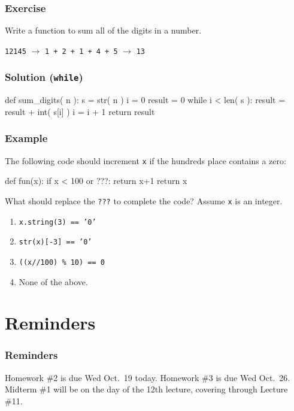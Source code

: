\documentclass[11pt]{beamer}
\begin{document}
\begin{frame}[fragile]
  \frametitle{Exercise}
  \Enlarge

  Write a function to sum all of the digits in a number.  %

  \begin{center}
  \texttt{12145} $\rightarrow$ \texttt{1 + 2 + 1 + 4 + 5} $\rightarrow$ \texttt{13}
  \end{center}
\end{frame}

\begin{frame}[fragile]
  \frametitle{Solution (\texttt{while})}
  \Enlarge

  \begin{semiverbatim}
def sum_digits( n ):
    s = str( n )
    i = 0
    result = 0
    while i < len( s ):
        result = result + int( s[i] )
        i = i + 1
    return result
  \end{semiverbatim}
\end{frame}


\begin{frame}[fragile]
	\frametitle{Example}
	\Enlarge
	
	The following code should increment \texttt{x} if the hundreds place contains a zero:
	\begin{semiverbatim}
        def fun(x): 
           if x < 100 or ???:
              return x+1
           return x 
\end{semiverbatim}
	What should replace the \texttt{???} to complete the code?  Assume \texttt{x} is an integer.
	\begin{enumerate}[label=\Alph*]
		\item  \texttt{x.string(3) == '0'}
		\item  \texttt{str(x)[-3] == '0'}  %
		\item  \texttt{((x//100) \% 10) == 0}  %
		\item  None of the above.
	\end{enumerate}
\end{frame}


\section{Reminders}

\begin{frame}
  \frametitle{Reminders}
  \Enlarge

  \begin{itemize}
  \myitem  Homework \#2 is due Wed Oct.\ 19 today.
  \myitem  Homework \#3 is due Wed Oct.\ 26.
  \myitem  Midterm \#1 will be on the day of the 12th lecture, covering through Lecture \#11.  
  \end{itemize}
\end{frame}
\end{document}
